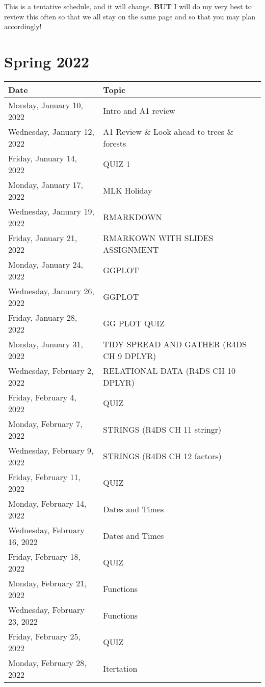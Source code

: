 \documentclass[
]{book}
\theoremstyle{definition}
\theoremstyle{definition}
\theoremstyle{definition}
\theoremstyle{definition}
\theoremstyle{remark}
\begin{document}
This is a tentative schedule, and it will change. \textbf{BUT} I will do my very best to review this often so that we all stay on the same page and so that you may plan accordingly!

\hypertarget{spring-2022}{%
\section*{Spring 2022}\label{spring-2022}}

\begin{longtable}[]{@{}ll@{}}
\toprule
Date & Topic \\
\midrule
\endhead
Monday, January 10, 2022 & Intro and A1 review \\
Wednesday, January 12, 2022 & A1 Review \& Look ahead to trees \& forests \\
Friday, January 14, 2022 & QUIZ 1 \\
Monday, January 17, 2022 & MLK Holiday \\
Wednesday, January 19, 2022 & RMARKDOWN \\
Friday, January 21, 2022 & RMARKOWN WITH SLIDES ASSIGNMENT \\
Monday, January 24, 2022 & GGPLOT \\
Wednesday, January 26, 2022 & GGPLOT \\
Friday, January 28, 2022 & GG PLOT QUIZ \\
Monday, January 31, 2022 & TIDY SPREAD AND GATHER (R4DS CH 9 DPLYR) \\
Wednesday, February 2, 2022 & RELATIONAL DATA (R4DS CH 10 DPLYR) \\
Friday, February 4, 2022 & QUIZ \\
Monday, February 7, 2022 & STRINGS (R4DS CH 11 stringr) \\
Wednesday, February 9, 2022 & STRINGS (R4DS CH 12 factors) \\
Friday, February 11, 2022 & QUIZ \\
Monday, February 14, 2022 & Dates and Times \\
Wednesday, February 16, 2022 & Dates and Times \\
Friday, February 18, 2022 & QUIZ \\
Monday, February 21, 2022 & Functions \\
Wednesday, February 23, 2022 & Functions \\
Friday, February 25, 2022 & QUIZ \\
Monday, February 28, 2022 & Itertation \\

\end{longtable}
\end{document}
